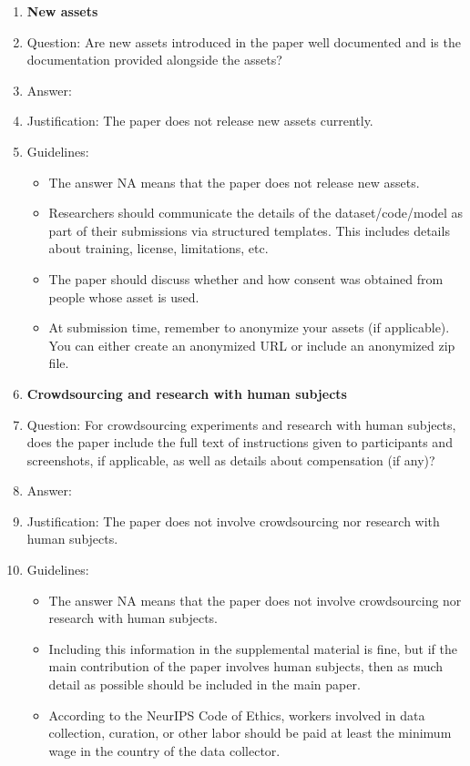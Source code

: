 \documentclass{article}
\numberwithin{equation}{section}
\theoremstyle{definition}
\begin{document}
\begin{enumerate}
\item {\bf New assets}
    \item[] Question: Are new assets introduced in the paper well documented and is the documentation provided alongside the assets?
    \item[] Answer: \answerNA{} %
    \item[] Justification: The paper does not release new assets currently.
    \item[] Guidelines:
    \begin{itemize}
        \item The answer NA means that the paper does not release new assets.
        \item Researchers should communicate the details of the dataset/code/model as part of their submissions via structured templates. This includes details about training, license, limitations, etc. 
        \item The paper should discuss whether and how consent was obtained from people whose asset is used.
        \item At submission time, remember to anonymize your assets (if applicable). You can either create an anonymized URL or include an anonymized zip file.
    \end{itemize}

\item {\bf Crowdsourcing and research with human subjects}
    \item[] Question: For crowdsourcing experiments and research with human subjects, does the paper include the full text of instructions given to participants and screenshots, if applicable, as well as details about compensation (if any)? 
    \item[] Answer: \answerNA{} %
    \item[] Justification: The paper does not involve crowdsourcing nor research with human subjects.
    \item[] Guidelines:
    \begin{itemize}
        \item The answer NA means that the paper does not involve crowdsourcing nor research with human subjects.
        \item Including this information in the supplemental material is fine, but if the main contribution of the paper involves human subjects, then as much detail as possible should be included in the main paper. 
        \item According to the NeurIPS Code of Ethics, workers involved in data collection, curation, or other labor should be paid at least the minimum wage in the country of the data collector. 
    \end{itemize}


\end{enumerate}
\end{document}
